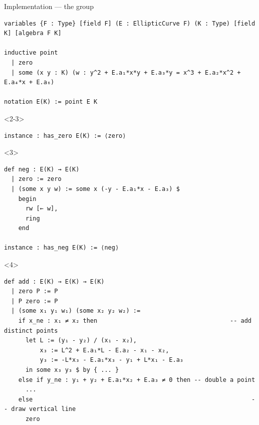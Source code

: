 \documentclass[10pt]{beamer}
\begin{document}
\begin{frame}[fragile, t]{Implementation --- the group}

\begin{lstlisting}[basicstyle=\scriptsize, frame=single]
variables {F : Type} [field F] (E : EllipticCurve F) (K : Type) [field K] [algebra F K]

inductive point
  | zero
  | some (x y : K) (w : y^2 + E.a₁*x*y + E.a₃*y = x^3 + E.a₂*x^2 + E.a₄*x + E.a₆)

notation E(K) := point E K
\end{lstlisting}


\begin{onlyenv}<2-3>
\begin{lstlisting}[basicstyle=\scriptsize, frame=single]
instance : has_zero E(K) := ⟨zero⟩
\end{lstlisting}
\end{onlyenv}


\begin{onlyenv}<3>
\begin{lstlisting}[basicstyle=\scriptsize, frame=single]
def neg : E(K) → E(K)
  | zero := zero
  | (some x y w) := some x (-y - E.a₁*x - E.a₃) $
    begin
      rw [← w],
      ring
    end

instance : has_neg E(K) := ⟨neg⟩
\end{lstlisting}
\end{onlyenv}


\begin{onlyenv}<4>
\begin{lstlisting}[basicstyle=\scriptsize, frame=single]
def add : E(K) → E(K) → E(K)
  | zero P := P
  | P zero := P
  | (some x₁ y₁ w₁) (some x₂ y₂ w₂) :=
    if x_ne : x₁ ≠ x₂ then                                     -- add distinct points
      let L := (y₁ - y₂) / (x₁ - x₂),
          x₃ := L^2 + E.a₁*L - E.a₂ - x₁ - x₂,
          y₃ := -L*x₃ - E.a₁*x₃ - y₁ + L*x₁ - E.a₃
      in some x₃ y₃ $ by { ... }
    else if y_ne : y₁ + y₂ + E.a₁*x₂ + E.a₃ ≠ 0 then -- double a point
      ...
    else                                                             -- draw vertical line
      zero


\end{lstlisting}
\end{onlyenv}
\end{frame}
\end{document}
